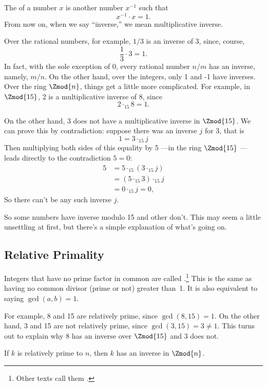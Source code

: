 The  of a number $x$ is another number
$x^{-1}$ such that
\[
x^{-1} \cdot x  = 1.
\]
From now on, when we say ``inverse,'' we mean multiplicative inverse.

Over the rational numbers, for example, $1 / 3$ is an inverse of 3,
since, course,
\[
\frac{1}{3} \cdot 3 = 1.
\]
In fact, with the sole exception of 0, every rational number $n/m$ has
an inverse, namely, $m/n$.  On the other hand, over the integers, only
1 and -1 have inverses.  Over the ring $\Zmod{n}$, things get a little
more complicated.  For example, in $\Zmod{15}$, 2 is a multiplicative
inverse of 8, since
\[
2 \cdot_{15} 8 = 1.
\]

On the other hand, 3 does not have a multiplicative inverse in
$\Zmod{15}$.  We can prove this by contradiction: suppose there was an
inverse $j$ for 3, that is
\[
1 = 3 \cdot_{15} j
\]
Then multiplying both sides of this equality by 5 ---in the ring
$\Zmod{15}$ ---leads directly to the contradiction $5 = 0$:
\begin{align*}
5 & = 5 \cdot_{15} (3 \cdot_{15} j)\\
  & = (5 \cdot_{15} 3) \cdot_{15} j\\
  & = 0 \cdot_{15} j = 0,
\end{align*}
So there can't be any such inverse $j$.

So some numbers have inverse modulo 15 and other don't.  This may seem
a little unsettling at first, but there's a simple explanation of
what's going on.

\subsection{Relative Primality}

Integers that have no prime factor in common are called
.\footnote{Other texts call them
  .}  This is the same as having no common divisor
(prime or not) greater than~1.  It is also equivalent to saying
$\gcd(a, b) = 1$.

For example, 8 and 15 are relatively prime, since $\gcd(8, 15) = 1$.
On the other hand, 3 and 15 are not relatively prime, since $\gcd(3,
15) = 3 \neq 1$.  This turns out to explain why 8 has an inverse over
$\Zmod{15}$ and 3 does not.

\begin{lemma}\label{lem:inverse-arb} If $k$ is relatively prime to
$n$, then $k$ has an inverse in $\Zmod{n}$.
\end{lemma}

